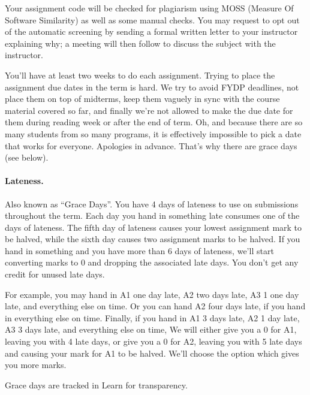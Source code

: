 \documentclass[letterpaper,10pt]{article}
\begin{document}
Your assignment code will be checked for plagiarism using MOSS (Measure Of Software Similarity) as well as some manual checks. You may request to opt out of the automatic screening by sending a formal written letter to your instructor explaining why; a meeting will then follow to discuss the subject with the instructor.

You'll have at least two weeks to do each assignment. Trying to place the assignment due dates in the term is hard. We try to avoid FYDP deadlines, not place them on top of midterms, keep them vaguely in sync with the course material covered so far, and finally we're not allowed to make the due date for them during reading week or after the end of term. Oh, and because there are so many students from so many programs, it is effectively impossible to pick a date that works for everyone. Apologies in advance. That's why there are grace days (see below).


\paragraph{Lateness.} Also known as ``Grace Days''. You have 4 days of lateness to use on 
submissions throughout the term. Each day you hand in something late
consumes one of the days of lateness. The fifth day of lateness causes
your lowest assignment mark to be halved, while the sixth day causes
two assignment marks to be halved. If you hand in something and you
have more than 6 days of lateness, we'll start converting marks to 0
and dropping the associated late days. You don't
get any credit for unused late days.

For example, you may hand in A1 one day late, A2 two days late, A3 1
one day late, and everything else on time.  Or you can hand A2 four
days late, if you hand in everything else on time. Finally, if you
hand in A1 3 days late, A2 1 day late, A3 3 days late, and
everything else on time, We will either give you a 0 for A1, leaving you
with 4 late days, or give you a 0 for A2, leaving you with 5 late days
and causing your mark for A1 to be halved. We'll choose the option
which gives you more marks.

Grace days are tracked in Learn for transparency.
\end{document}

